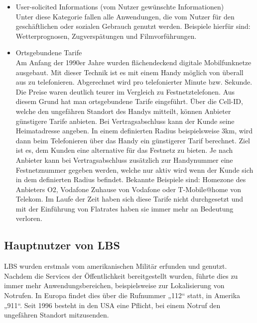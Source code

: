 \begin{itemize}
	\item User-solicited Informations (vom Nutzer gewünschte Informationen)\\
Unter diese Kategorie fallen alle Anwendungen, die vom Nutzer für den geschäftlichen oder sozialen Gebrauch genutzt werden. Beispiele hierfür sind: Wetterprognosen, Zugverspätungen und Filmvorführungen.
	\item Ortsgebundene Tarife\\
	Am Anfang der 1990er Jahre wurden flächendeckend digitale Mobilfunknetze ausgebaut. Mit dieser Technik ist es mit einem Handy möglich von überall aus zu telefonieren. Abgerechnet wird pro telefonierter Minute bzw. Sekunde. Die Preise waren deutlich teurer im Vergleich zu Festnetztelefonen. Aus diesem Grund hat man ortsgebundene Tarife eingeführt. Über die Cell-ID, welche den ungefähren Standort des Handys mitteilt, können Anbieter günstigere Tarife anbieten. Bei Vertragsabschluss kann der Kunde seine Heimatadresse angeben. In einem definierten Radius beispielsweise 3km, wird dann beim Telefonieren über das Handy ein günstigerer Tarif berechnet. Ziel ist es, dem Kunden eine alternative für das Festnetz zu bieten. Je nach Anbieter kann bei Vertragsabschluss zusätzlich zur Handynummer eine Festnetznummer gegeben werden, welche nur aktiv wird wenn der Kunde sich in dem definierten Radius befindet. Bekannte Beispiele sind: Homezone des Anbieters O2, Vodafone Zuhause von Vodafone oder T-Mobile@home von Telekom. Im Laufe der Zeit haben sich diese Tarife nicht durchgesetzt und mit der Einführung von Flatrates haben sie immer mehr an Bedeutung verloren. \cite{OrtgTarife} 
\end{itemize}


\subsection{Hauptnutzer von LBS}

LBS wurden erstmals vom amerikanischen Militär erfunden und genutzt. Nachdem die Services der Öffentlichkeit bereitgestellt wurden, führte dies zu immer mehr Anwendungsbereichen, beispielsweise zur Lokalisierung von Notrufen. In Europa findet dies über die Rufnummer „112“ statt, in Amerika „911“.  Seit 1996 besteht in den USA eine Pflicht, bei einem Notruf den ungefähren Standort mitzusenden. 

